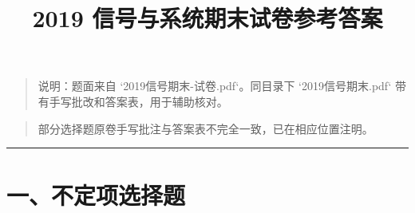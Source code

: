 \documentclass[11pt]{ctexart}
\title{2019 信号与系统期末试卷参考答案}
\author{}
\date{}
\begin{document}
\maketitle



\begin{quote}\small 说明：题面来自 `2019信号期末-试卷.pdf`。同目录下 `2019信号期末.pdf` 带有手写批改和答案表，用于辅助核对。\end{quote}

\begin{quote}\small 部分选择题原卷手写批注与答案表不完全一致，已在相应位置注明。\end{quote}



\medskip\hrule\medskip



\section*{一、不定项选择题}
\end{document}
